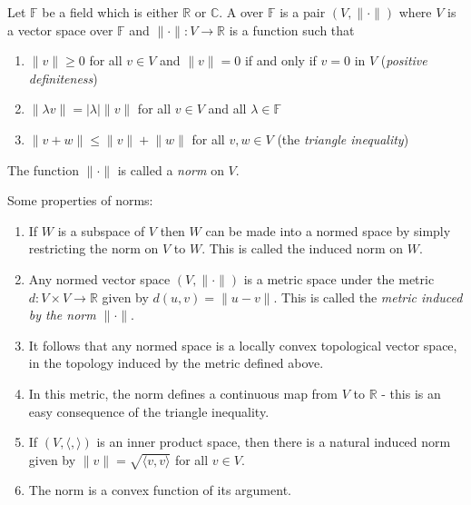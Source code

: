 \documentclass[12pt]{article}
\theoremstyle{remark}
\newcommand{\norm}[1]{\lVert #1 \rVert}
\newcommand{\abs}[1]{\lvert #1 \rvert}
\newcommand{\ip}[2]{\langle #1 , #2 \rangle}
\begin{document}
Let $\mathbb{F}$ be a field which is either $\mathbb{R}$ or $\mathbb{C}$.  A \emph{} over $\mathbb{F}$ is a pair $(V,\norm{\cdot})$ where $V$ is a vector space over $\mathbb{F}$ and $\norm{\cdot}\colon V\to\mathbb{R}$ is a function such that
\begin{enumerate}
\item $\norm{v}\geq 0$ for all $v\in V$ and $\norm{v}=0$ if and only if $v=0$ in $V$ (\emph{positive definiteness})
\item $\norm{\lambda v} = \abs{\lambda}\norm{v}$ for all $v\in V$ and all $\lambda\in\mathbb{F}$
\item $\norm{v+w}\leq\norm{v}+\norm{w}$ for all $v,w\in V$ (the \emph{triangle inequality})
\end{enumerate}

The function $\norm{\cdot}$ is called a \emph{norm} on $V$.

Some properties of norms:

\begin{enumerate}
\item
If $W$ is a subspace of $V$ then $W$ can be made into a normed space by simply restricting the norm on $V$ to $W$.  This is called the induced norm on $W$.

\item
Any normed vector space $(V,\norm{\cdot})$ is a metric space under the metric $d\colon V \times V \to \mathbb{R}$ given by $d(u,v)=\norm{u-v}$.  This is called the \emph{metric induced by the norm $\norm{\cdot}$}.

\item
It follows that any normed space is a locally convex topological vector space, in the topology induced by the metric defined above.

\item
In this metric, the norm defines a continuous map from $V$ to $\mathbb{R}$ - this is an easy consequence of the triangle inequality.

\item
If $(V, \ip{}{})$ is an inner product space, then there is a natural induced norm given by $\norm{v} = \sqrt{\ip{v}{v}}$ for all $v \in V$.

\item
The norm is a convex function of its argument.
\end{enumerate}
\end{document}
